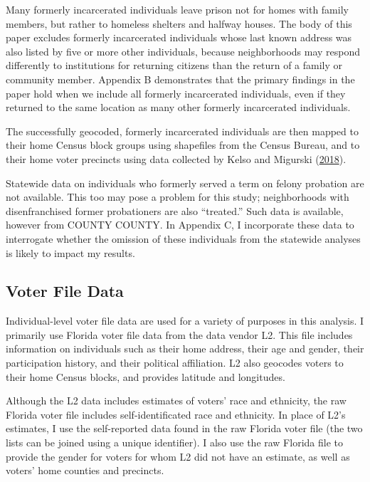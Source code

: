 \documentclass[
  12pt,
]{article}
\begin{document}
Many formerly incarcerated individuals leave prison not for homes with family members, but rather to homeless shelters and halfway houses. The body of this paper excludes formerly incarcerated individuals whose last known address was also listed by five or more other individuals, because neighborhoods may respond differently to institutions for returning citizens than the return of a family or community member. Appendix B demonstrates that the primary findings in the paper hold when we include all formerly incarcerated individuals, even if they returned to the same location as many other formerly incarcerated individuals.

The successfully geocoded, formerly incarcerated individuals are then mapped to their home Census block groups using shapefiles from the Census Bureau, and to their home voter precincts using data collected by Kelso and Migurski (\protect\hyperlink{ref-Kelso2018}{2018}).

Statewide data on individuals who formerly served a term on felony probation are not available. This too may pose a problem for this study; neighborhoods with disenfranchised former probationers are also ``treated.'' Such data is available, however from COUNTY COUNTY. In Appendix C, I incorporate these data to interrogate whether the omission of these individuals from the statewide analyses is likely to impact my results.

\hypertarget{voter-file-data}{%
\subsection*{Voter File Data}\label{voter-file-data}}

Individual-level voter file data are used for a variety of purposes in this analysis. I primarily use Florida voter file data from the data vendor L2. This file includes information on individuals such as their home address, their age and gender, their participation history, and their political affiliation. L2 also geocodes voters to their home Census blocks, and provides latitude and longitudes.

Although the L2 data includes estimates of voters' race and ethnicity, the raw Florida voter file includes self-identificated race and ethnicity. In place of L2's estimates, I use the self-reported data found in the raw Florida voter file (the two lists can be joined using a unique identifier). I also use the raw Florida file to provide the gender for voters for whom L2 did not have an estimate, as well as voters' home counties and precincts.
\end{document}
